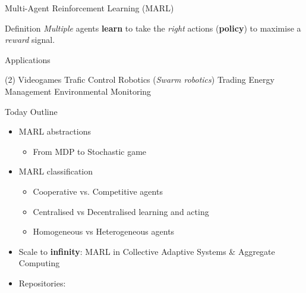 \documentclass[presentation, 8pt]{beamer}\mode<presentation>{\usetheme{AMSBolognaFC}}
\begin{document}
\begin{frame}[c]{Multi-Agent Reinforcement Learning (MARL)}

\begin{exampleblock}{Definition}
	\emph{Multiple} agents \textbf{learn} to take the \emph{right} actions (\textbf{policy}) to maximise a \emph{reward} signal.
\end{exampleblock}

\begin{alertblock}{Applications}
	\begin{tasks}(2)
		\task Videogames
		\task Trafic Control
		\task Robotics (\emph{Swarm robotics})
		\task Trading
		\task Energy Management
		\task Environmental Monitoring
	\end{tasks}
\end{alertblock}
\begin{exampleblock}{Today Outline}
	\begin{itemize}
		\item MARL abstractions
		\begin{itemize}
			\item[\faArrowRight] From MDP to Stochastic game
		\end{itemize}
		\item MARL classification
		\begin{itemize}
			\item[\faArrowRight] Cooperative vs. Competitive agents
			\item[\faArrowRight] Centralised vs Decentralised learning and acting
			\item[\faArrowRight] Homogeneous vs Heterogeneous agents
		\end{itemize}
		\item Scale to \textbf{infinity}: MARL in Collective Adaptive Systems \& Aggregate Computing
		\item Repositories: 
			\href{https://github.com/cric96/pc-multi-agent-modelling}{\faLink}
			\href{https://github.com/cric96/swarm-rl-alchemist}{\faLink}

	\end{itemize}
\end{exampleblock}
\end{frame}
\end{document}
